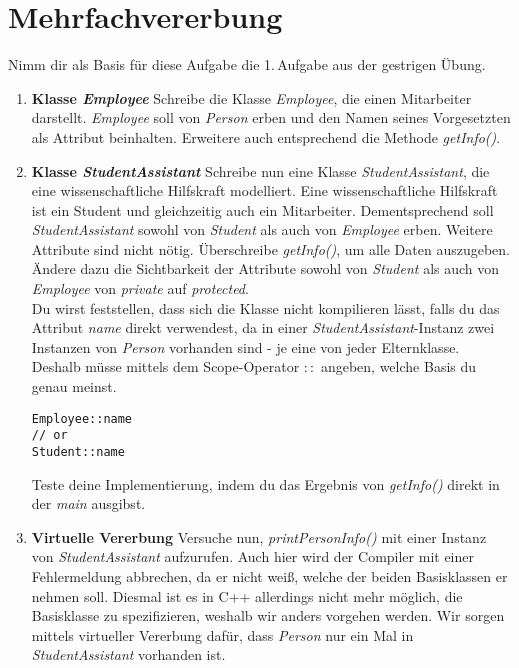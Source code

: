 

\newcommand{\tag}{4}

\cppSetTitle


	
\cppSetHeaderAndMakeTitle 	

\vspace{5mm}

\section{Mehrfachvererbung}
Nimm dir als Basis für diese Aufgabe die 1.\,Aufgabe aus der gestrigen Übung.

\begin{enumerate}
\item \textbf{Klasse \emph{Employee}}
Schreibe die Klasse \emph{Employee}, die einen Mitarbeiter darstellt.
\emph{Employee} soll von \emph{Person} erben und den Namen seines Vorgesetzten als Attribut beinhalten.
Erweitere auch entsprechend die Methode \emph{getInfo()}.

\item \textbf{Klasse \emph{StudentAssistant}}
Schreibe nun eine Klasse \emph{StudentAssistant}, die eine wissenschaftliche Hilfskraft modelliert.
Eine wissenschaftliche Hilfskraft ist ein Student und gleichzeitig auch ein Mitarbeiter.
Dementsprechend soll \emph{StudentAssistant} sowohl von \emph{Student} als auch von \emph{Employee} erben.
Weitere Attribute sind nicht nötig.
Überschreibe \emph{getInfo()}, um alle Daten auszugeben.
Ändere dazu die Sichtbarkeit der Attribute sowohl von \emph{Student} als auch von \emph{Employee} von \emph{private} auf \emph{protected}. \\

Du wirst feststellen, dass sich die Klasse nicht kompilieren lässt, falls du das Attribut \emph{name} direkt verwendest, da in einer \emph{StudentAssistant}-Instanz zwei Instanzen von \emph{Person} vorhanden sind - je eine von jeder Elternklasse. Deshalb müsse mittels dem Scope-Operator $::$ angeben, welche Basis du genau meinst.
\begin{lstlisting}
Employee::name
// or
Student::name
\end{lstlisting}

Teste deine Implementierung, indem du das Ergebnis von \emph{getInfo()} direkt in der \emph{main} ausgibst.

\item \textbf{Virtuelle Vererbung}
Versuche nun, \emph{printPersonInfo()} mit einer Instanz von \emph{StudentAssistant} aufzurufen. Auch hier wird der Compiler mit einer Fehlermeldung abbrechen, da er nicht weiß, welche der beiden Basisklassen er nehmen soll.
Diesmal ist es in C++ allerdings nicht mehr möglich, die Basisklasse zu spezifizieren, weshalb wir anders vorgehen werden.
Wir sorgen mittels virtueller Vererbung dafür, dass \emph{Person} nur ein Mal in \emph{StudentAssistant} vorhanden ist.


\end{enumerate}
